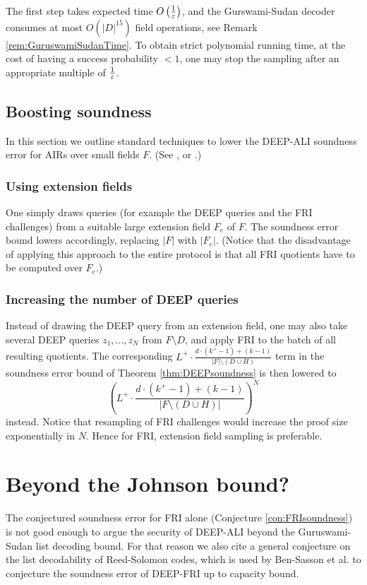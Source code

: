 \documentclass[11pt,article,oneside]{memoir}
\theoremstyle{definition}
\theoremstyle{remark}
\begin{document}
The first step takes expected time $O\left(\nicefrac{1}{\varepsilon}\right)$, and the Gurswami-Sudan decoder consumes at most $O\left(|D|^{15}\right)$ field operations, see Remark \ref{rem:GuruswamiSudanTime}.
To obtain strict polynomial running time, at the cost of having a success probability $<1$, one may stop the sampling after an appropriate multiple of $\nicefrac{1}{\varepsilon}$.
 
\subsection{Boosting soundness}
In this section we outline standard techniques to lower the DEEP-ALI soundness error for AIRs over small fields $F$. 
(See \cite{ethSTARK}, or \cite{PolygonZero}.)

\subsubsection{Using extension fields}
One simply draws queries (for example the DEEP queries and the FRI challenges) from a suitable large extension field $F_e$ of $F$.
The soundness error bound lowers accordingly, replacing $|F|$ with $|F_e|$. 
(Notice that the disadvantage of applying this approach to the entire protocol is that all FRI quotients have to be computed over $F_e$.)
 
\subsubsection{Increasing the number of DEEP queries}
Instead of drawing the DEEP query from an extension field, one may also take several DEEP queries $z_1,\ldots , z_N$ from $F\setminus D$, and apply FRI to the batch of all resulting quotients. 
The corresponding $L^+\cdot\frac{d\cdot (k^+-1)+ (k -1)}{|F|\setminus (D\cup H)}$ term in the soundness error bound of Theorem \ref{thm:DEEPsoundness} is then lowered to  
\[
\left(L^+\cdot\frac{d\cdot (k^+ - 1) + (k - 1)}{|F\setminus (D\cup H)|}\right)^N
\]
instead. 
Notice that resampling of FRI challenges would increase the proof size exponentially in $N$. 
Hence for  FRI, extension field sampling is preferable.  

\section{Beyond the Johnson bound?}
\label{s:RSConjecture}

The conjectured soundness error for FRI alone (Conjecture \ref{con:FRIsoundness}) is not good enough to argue the security of DEEP-ALI beyond the Guruswami-Sudan list decoding bound. 
For that reason we also cite a general conjecture on the list decodability of Reed-Solomon codes, which is used by Ben-Sasson et al. to conjecture the soundness error of DEEP-FRI up to capacity bound. 
\end{document}
